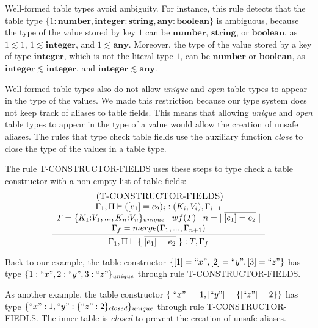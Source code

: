 \documentclass{sigplanconf}
\newcommand{\Any}{\mathbf{any}}
\newcommand{\Boolean}{\mathbf{boolean}}
\newcommand{\Integer}{\mathbf{integer}}
\newcommand{\Number}{\mathbf{number}}
\newcommand{\String}{\mathbf{string}}
\newcommand{\mylabel}[1]{\; (\textsc{#1})}
\newcommand{\env}{\Gamma}
\newcommand{\penv}{\Pi}
\begin{document}
Well-formed table types avoid ambiguity.
For instance, this rule detects that the table type
$\{1:\Number, \Integer:\String, \Any:\Boolean\}$ is ambiguous,
because the type of the value stored by key $1$ can be
$\Number$, $\String$, or $\Boolean$, as $1 \lesssim 1$,
$1 \lesssim \Integer$, and $1 \lesssim \Any$.
Moreover, the type of the value stored by a key of type $\Integer$,
which is not the literal type $1$, can be $\Number$ or $\Boolean$,
as $\Integer \lesssim \Integer$, and $\Integer \lesssim \Any$.

Well-formed table types also do not allow \emph{unique} and
\emph{open} table types to appear in the type of the values.
We made this restriction because our type system does not keep
track of aliases to table fields.
This means that allowing \emph{unique} and \emph{open} table
types to appear in the type of a value would allow the
creation of unsafe aliases.
The rules that type check table fields use the auxiliary function
\emph{close} to close the type of the values in a table type.

The rule \textsc{T-CONSTRUCTOR-FIELDS} uses these steps to type check a
table constructor with a non-empty list of table fields:
\[
\begin{array}{c}
\mylabel{T-CONSTRUCTOR-FIELDS}\\
\dfrac{\begin{array}{c}
       \env_{1}, \penv \vdash ([e_{1}] = e_{2})_{i}:(K_{i},V_{i}), \env_{i+1} \\
       T = \{K_{1}{:}V_{1}, ..., K_{n}{:}V_{n}\}_{unique} \;\;\;
       wf(T) \;\;\;
       n = |\;\overline{[e_{1}] = e_{2}}\;| \\
       \env_{f} = merge(\env_{1}, ..., \env_{n+1})
       \end{array}}
      {\env_{1}, \penv \vdash \{\;\overline{[e_{1}] = e_{2}}\;\}:T, \env_{f}}
\end{array}
\]

Back to our example, the table constructor
$\{ [1] = ``x", [2] = ``y", [3] = ``z" \}$ has type
$\{1:``x", 2:``y", 3:``z"\}_{unique}$ through rule \textsc{T-CONSTRUCTOR-FIELDS}.

As another example, the table constructor $\{[``x"] = 1, [``y"] = \{[``z"] = 2\}\}$
has type $\{``x":1, ``y":\{``z":2\}_{closed}\}_{unique}$ through rule
\textsc{T-CONSTRUCTOR-FIEDLS}.
The inner table is \emph{closed} to prevent the creation of unsafe aliases.
\end{document}
